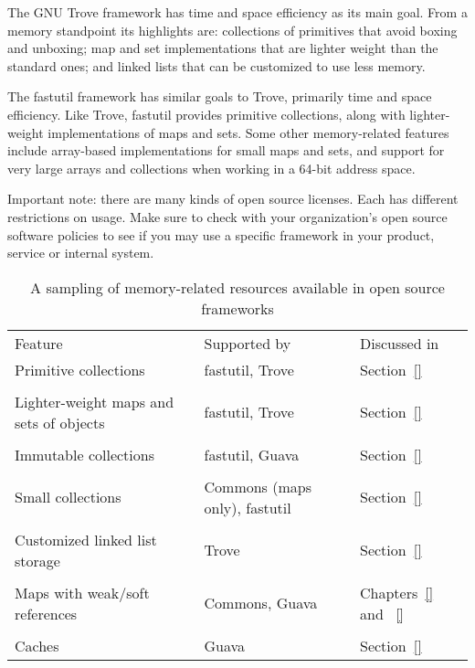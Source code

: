 The GNU Trove framework has time and space efficiency as its main goal.
From a memory standpoint its highlights are: collections of primitives that
avoid boxing and unboxing;  map
and set implementations that are lighter weight than the standard ones; and
linked lists that can be customized to use less memory.

The fastutil framework has similar goals to Trove, primarily time and space
efficiency. Like Trove, fastutil provides primitive collections, along with
lighter-weight implementations of maps and sets. Some other memory-related
features include array-based implementations for small
maps and sets, and support for very large arrays and collections when working
in a 64-bit address space.

Important note: there are many kinds of open source licenses. Each has different
restrictions on usage. Make sure to check with your organization's open
source software policies to see if you may use a specific framework in 
your product, service or internal system.

\begin{table}
\centering
	\begin{tabular}{p{6cm} p{3cm} p{4cm}}
	\toprule

	   Feature & Supported by & Discussed in
	\\ \cmidrule(r){1-1} \cmidrule(l){2-2} \cmidrule(l){3-3}
	Primitive collections & fastutil, Trove & Section~\ref{}
	\\
	\\
	Lighter-weight maps and sets of objects & fastutil, Trove & Section~\ref{}
	\\
	\\
	Immutable collections & fastutil, Guava & Section~\ref{}
	\\
	\\
	Small collections & Commons (maps only), fastutil & Section~\ref{}
	\\
	\\
	Customized linked list storage & Trove & Section~\ref{}
	\\
	\\
	Maps with weak/soft references & Commons, Guava & Chapters~\ref{} and ~\ref{}
	\\
	\\
	Caches & Guava & Section~\ref{}
	\\
	\bottomrule
	\end{tabular}
	\caption{A sampling of memory-related resources available in open source
	frameworks}
	\label{tab:alternative-collections}
\end{table}

